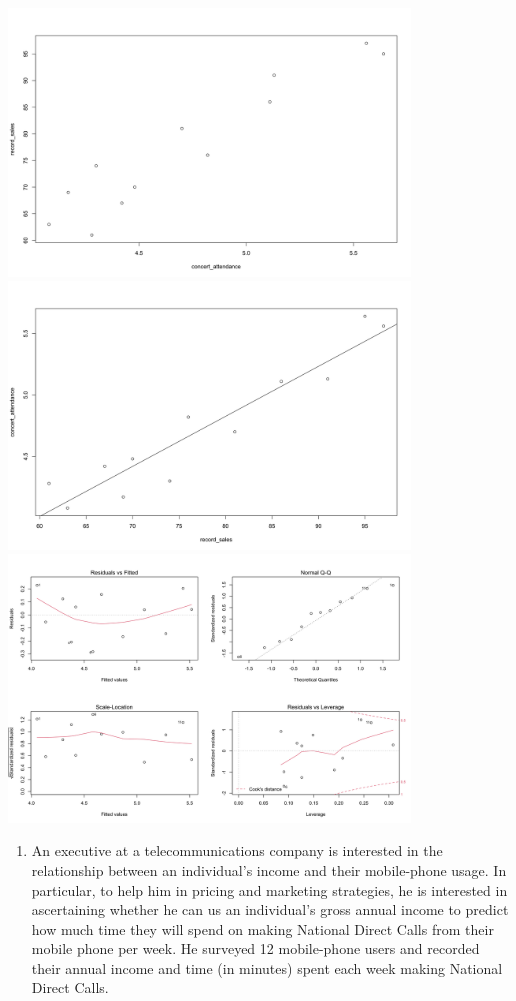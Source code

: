 \documentclass[]{book}
\providecommand{\tightlist}{%
  \setlength{\itemsep}{0pt}\setlength{\parskip}{0pt}}
\begin{document}
\begin{center}\includegraphics[width=0.8\textwidth]{figure/q1-1} \includegraphics[width=0.8\textwidth]{figure/q1-2} \includegraphics[width=0.8\textwidth]{figure/q1-3} \end{center}

\begin{enumerate}
\def\labelenumi{\arabic{enumi}.}
\setcounter{enumi}{2}
\tightlist
\item
  An executive at a telecommunications company is interested in the relationship between an individual's income and their mobile-phone usage. In particular, to help him in pricing and marketing strategies, he is interested in ascertaining whether he can us an individual's gross annual income to predict how much time they will spend on making National Direct Calls from their mobile phone per week. He surveyed 12 mobile-phone users and recorded their annual income and time (in minutes) spent each week making National Direct Calls.
\end{enumerate}
\end{document}
